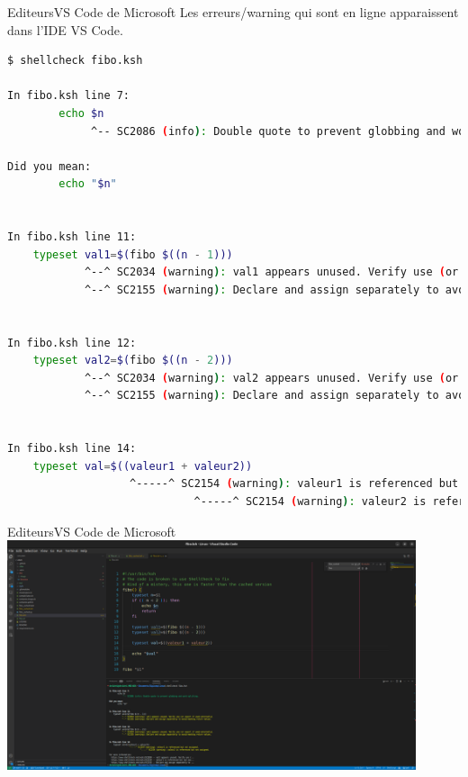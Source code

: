 \documentclass{beamer}
\begin{document}
    \begin{frame}[fragile]{Editeurs}{VS Code de Microsoft}
        Les erreurs/warning qui sont en ligne apparaissent dans l'IDE VS Code.
        \begin{lstlisting}[language=bash,basicstyle=\tiny\ttfamily]
$ shellcheck fibo.ksh

In fibo.ksh line 7:
        echo $n
             ^-- SC2086 (info): Double quote to prevent globbing and word splitting.

Did you mean:
        echo "$n"


In fibo.ksh line 11:
    typeset val1=$(fibo $((n - 1)))
            ^--^ SC2034 (warning): val1 appears unused. Verify use (or export if used externally).
            ^--^ SC2155 (warning): Declare and assign separately to avoid masking return values.


In fibo.ksh line 12:
    typeset val2=$(fibo $((n - 2)))
            ^--^ SC2034 (warning): val2 appears unused. Verify use (or export if used externally).
            ^--^ SC2155 (warning): Declare and assign separately to avoid masking return values.


In fibo.ksh line 14:
    typeset val=$((valeur1 + valeur2))
                   ^-----^ SC2154 (warning): valeur1 is referenced but not assigned.
                             ^-----^ SC2154 (warning): valeur2 is referenced but not assigned.
        \end{lstlisting}
    \end{frame}

    \begin{frame}{Editeurs}{VS Code de Microsoft}
        \centering
        \includegraphics[width=12cm]{image/shellcheck-warning}
    \end{frame}
\end{document}
